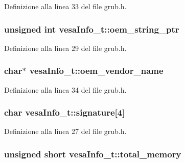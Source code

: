 Definizione alla linea 33 del file grub.\+h.

\hypertarget{structvesaInfo__t_aee5b0eb81a986dc3adadc287dd6809c4}{
\subsubsection[{oem\+\_\+string\+\_\+ptr}]{\setlength{\rightskip}{0pt plus 5cm}unsigned int vesa\+Info\+\_\+t\+::oem\+\_\+string\+\_\+ptr}}\label{structvesaInfo__t_aee5b0eb81a986dc3adadc287dd6809c4}


Definizione alla linea 29 del file grub.\+h.

\hypertarget{structvesaInfo__t_a35b0e91dc1f97ab1f05b8c9a6fe8988f}{
\subsubsection[{oem\+\_\+vendor\+\_\+name}]{\setlength{\rightskip}{0pt plus 5cm}char$\ast$ vesa\+Info\+\_\+t\+::oem\+\_\+vendor\+\_\+name}}\label{structvesaInfo__t_a35b0e91dc1f97ab1f05b8c9a6fe8988f}


Definizione alla linea 34 del file grub.\+h.

\hypertarget{structvesaInfo__t_a48deedd69aeb2ce0d1c27e77f9da23c5}{
\subsubsection[{signature}]{\setlength{\rightskip}{0pt plus 5cm}char vesa\+Info\+\_\+t\+::signature\mbox{[}4\mbox{]}}}\label{structvesaInfo__t_a48deedd69aeb2ce0d1c27e77f9da23c5}


Definizione alla linea 27 del file grub.\+h.

\hypertarget{structvesaInfo__t_ab94cc102e07cdfbf3cb53690bf205321}{
\subsubsection[{total\+\_\+memory}]{\setlength{\rightskip}{0pt plus 5cm}unsigned short vesa\+Info\+\_\+t\+::total\+\_\+memory}}\label{structvesaInfo__t_ab94cc102e07cdfbf3cb53690bf205321}


